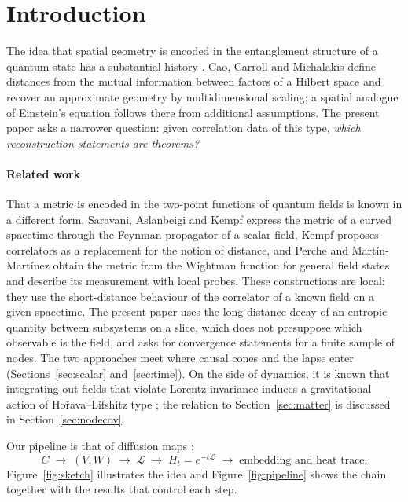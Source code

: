 \documentclass[11pt,a4paper]{article}
\theoremstyle{stmt}
\theoremstyle{defn}
\theoremstyle{rmk}
\numberwithin{equation}{section}
\newcommand{\Lc}{\mathcal{L}}
\begin{document}
\section{Introduction}

The idea that spatial geometry is encoded in the entanglement structure of a quantum state has a substantial history \cite{Jacobson95,VanRaamsdonk,CCM}. Cao, Carroll and Michalakis \cite{CCM} define distances from the mutual information between factors of a Hilbert space and recover an approximate geometry by multidimensional scaling; a spatial analogue of Einstein's equation follows there from additional assumptions. The present paper asks a narrower question: given correlation data of this type, \emph{which reconstruction statements are theorems?}

\paragraph{Related work} That a metric is encoded in the two-point functions of quantum fields is known in a different form. Saravani, Aslanbeigi and Kempf \cite{SAK} express the metric of a curved spacetime through the Feynman propagator of a scalar field, Kempf \cite{Kempf21} proposes correlators as a replacement for the notion of distance, and Perche and Mart\'in-Mart\'inez \cite{PercheMM} obtain the metric from the Wightman function for general field states and describe its measurement with local probes. These constructions are local: they use the short-distance behaviour of the correlator of a known field on a given spacetime. The present paper uses the long-distance decay of an entropic quantity between subsystems on a slice, which does not presuppose which observable is the field, and asks for convergence statements for a finite sample of nodes. The two approaches meet where causal cones and the lapse enter (Sections~\ref{sec:scalar} and~\ref{sec:time}). On the side of dynamics, it is known that integrating out fields that violate Lorentz invariance induces a gravitational action of Ho\v{r}ava--Lifshitz type \cite{NS10,DSS,LMP}; the relation to Section~\ref{sec:matter} is discussed in Section~\ref{sec:nodecov}.

Our pipeline is that of diffusion maps \cite{CoifmanLafon}:
\begin{equation}\label{eq:pipeline}
C \;\longrightarrow\; (V,W) \;\longrightarrow\; \Lc \;\longrightarrow\; H_t=e^{-t\Lc} \;\longrightarrow\; \text{embedding and heat trace}.
\end{equation}
Figure~\ref{fig:sketch} illustrates the idea and Figure~\ref{fig:pipeline} shows the chain together with the results that control each step.
\end{document}
